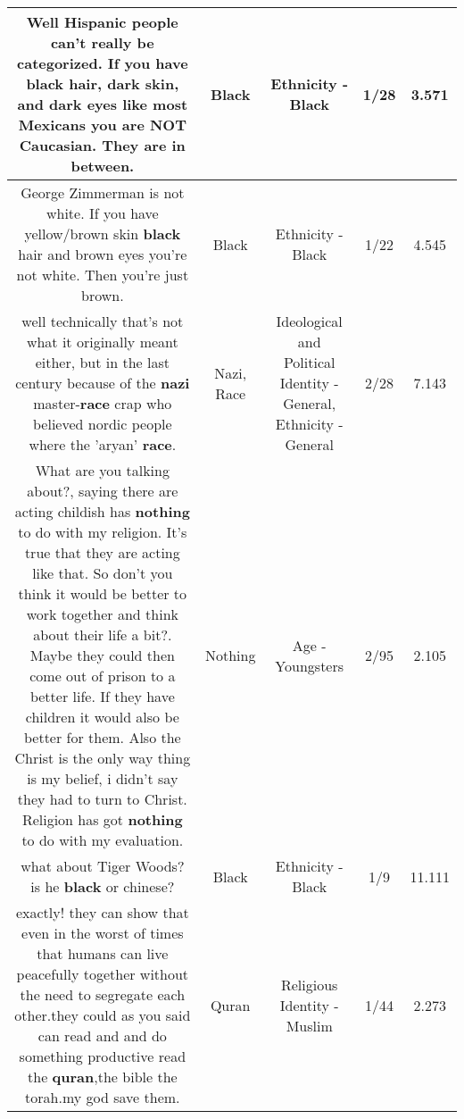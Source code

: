 \documentclass[11pt]{article}
\newlength\mylength
\begin{document}
\begin{center}
\begin{longtable}{|C{.65\mylength}|C{.30\mylength}|C{.12\mylength}|C{.12\mylength}|C{.12\mylength}|}
  \small Well Hispanic people can't really be categorized. If you have \textbf{black} hair, dark skin, and dark eyes like most Mexicans you are NOT Caucasian. They are in between.\normalsize   & Black & Ethnicity - Black & 1/28 & 3.571 \\  \hline
  \small George Zimmerman is not white. If you have yellow/brown skin \textbf{black} hair and brown eyes you're not white. Then you're just brown.\normalsize   & Black & Ethnicity - Black & 1/22 & 4.545 \\  \hline
  \small well technically that's not what it originally meant either, but in the last century because of the \textbf{nazi} master-\textbf{race} crap who believed nordic people where the 'aryan' \textbf{race}.\normalsize   & Nazi, Race &  Ideological and Political Identity - General, Ethnicity - General & 2/28 & 7.143 \\  \hline
  \small What are you talking about?, saying there are acting childish has \textbf{nothing} to do with my religion. It's true that they are acting like that. So don't you think it would be better to work together and think about their life a bit?. Maybe they could then come out of prison to a better life. If they have children it would also be better for them. Also the  Christ is the only way thing is my belief, i didn't say they had to turn to Christ. Religion has got \textbf{nothing} to do with my evaluation.\normalsize   & Nothing & Age - Youngsters & 2/95 & 2.105 \\  \hline
  \small what about Tiger Woods? is he \textbf{black} or chinese?\normalsize   & Black & Ethnicity - Black & 1/9 & 11.111 \\  \hline
  \small exactly! they can show that even in the worst of times that humans can live peacefully together without the need to segregate each other.they could as you said can read and and do something productive read the \textbf{quran},the bible the torah.my god save them.\normalsize   & Quran & Religious Identity - Muslim & 1/44 & 2.273 \\  \hline

\end{longtable}
\end{center}
\end{document}
